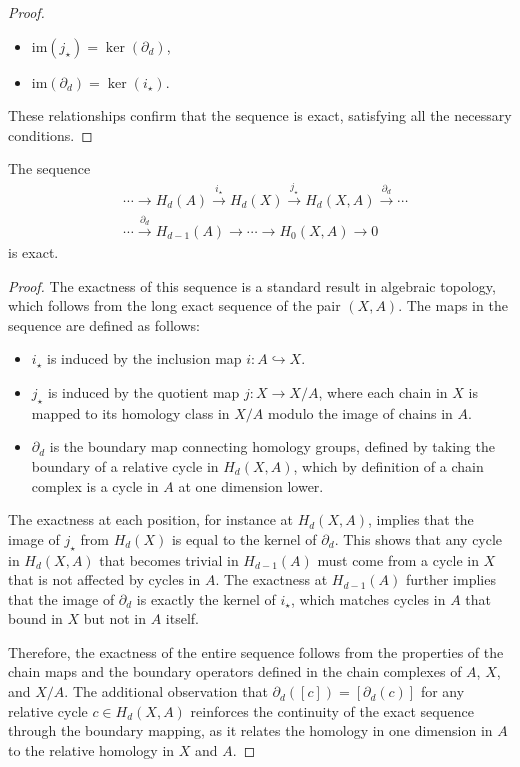 \begin{proof}
\begin{itemize}
		\item $\mathrm{im}(j_{\star}) = \ker(\partial_{d})$,

		\item $\mathrm{im}(\partial_{d}) = \ker(i_{\star})$.
	\end{itemize}
	These relationships confirm that the sequence is exact, satisfying all the
	necessary conditions.
\end{proof}

\begin{proposition}
	The sequence
	\begin{align}
		&\cdots \rightarrow H_{d}(A) \xrightarrow{i_\star}H_{d}(X) \xrightarrow{j_\star}
		H_{d}(X,A) \xrightarrow{\partial_d} \cdots \\
		&\cdots \xrightarrow{\partial_d} H_{d-1}(A) \rightarrow \cdots \rightarrow
		H_{0}(X,A) \rightarrow 0
	\end{align}
	is exact.
\end{proposition}

\begin{proof}
	The exactness of this sequence is a standard result in algebraic topology,
	which follows from the long exact sequence of the pair $(X, A)$. The maps in the
	sequence are defined as follows:
	\begin{itemize}
		\item $i_{\star}$ is induced by the inclusion map $i: A \hookrightarrow X$.

		\item $j_{\star}$ is induced by the quotient map $j: X \rightarrow X/A$,
			where each chain in $X$ is mapped to its homology class in $X/A$ modulo
			the image of chains in $A$.

		\item $\partial_{d}$ is the boundary map connecting homology groups, defined
			by taking the boundary of a relative cycle in $H_{d}(X,A)$, which by definition
			of a chain complex is a cycle in $A$ at one dimension lower.
	\end{itemize}

	The exactness at each position, for instance at $H_{d}(X,A)$, implies that the
	image of $j_{\star}$ from $H_{d}(X)$ is equal to the kernel of $\partial_{d}$.
	This shows that any cycle in $H_{d}(X,A)$ that becomes trivial in $H_{d-1}(A)$
	must come from a cycle in $X$ that is not affected by cycles in $A$. The exactness
	at $H_{d-1}(A)$ further implies that the image of $\partial_{d}$ is exactly the
	kernel of $i_{\star}$, which matches cycles in $A$ that bound in $X$ but not
	in $A$ itself.

	Therefore, the exactness of the entire sequence follows from the properties of
	the chain maps and the boundary operators defined in the chain complexes of $A$,
	$X$, and $X/A$. The additional observation that
	$\partial_{d}([c]) = [\partial_{d}(c)]$ for any relative cycle
	$c \in H_{d}(X,A)$ reinforces the continuity of the exact sequence through the
	boundary mapping, as it relates the homology in one dimension in $A$ to the relative
	homology in $X$ and $A$.
\end{proof}

